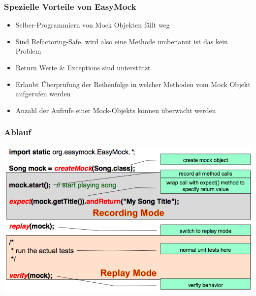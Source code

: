 \documentclass[a4paper,10pt]{article}
\begin{document}
\subsubsection{Spezielle Vorteile von EasyMock}
\begin{itemize}
\item Selber-Programmiern von Mock Objekten fällt weg
\item Sind Refactoring-Safe, wird also eine Methode umbenannt ist das kein Problem
\item Return Werte \& Exceptions sind unterstützt
\item Erlaubt Überprüfung der Reihenfolge in welcher Methoden vom Mock Objekt aufgerufen werden 
\item Anzahl der Aufrufe einer Mock-Objekts können überwacht werden
\end{itemize}

\subsubsection{Ablauf}
\includegraphics[scale=0.6]{easymock.png} \\
\end{document}
